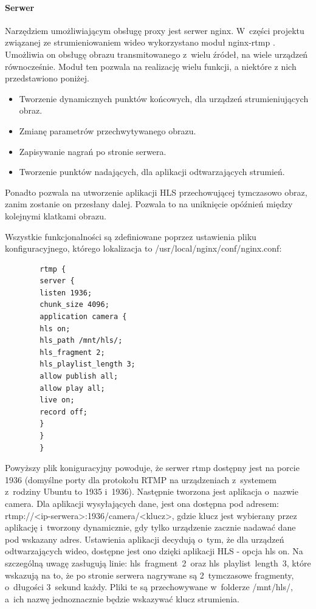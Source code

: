 \documentclass[polish,bachelor,a4paper,oneside]{ppfcmthesis}
\begin{document}
    \paragraph{Serwer}
    Narzędziem umożliwiającym obsługę proxy jest serwer nginx. W~części projektu związanej ze strumieniowaniem wideo wykorzystano moduł nginx-rtmp \cite{NGINX}. Umożliwia on obsługę obrazu transmitowanego z~wielu źródeł, na wiele urządzeń równocześnie.
    Moduł ten pozwala na realizację wielu funkcji, a niektóre z nich przedstawiono poniżej.
    \begin{itemize}
        \item Tworzenie dynamicznych punktów końcowych, dla urządzeń strumieniujących obraz.
        \item Zmianę parametrów przechwytywanego obrazu.
        \item Zapisywanie nagrań po stronie serwera.
        \item Tworzenie punktów nadających, dla aplikacji odtwarzających strumień.
    \end{itemize}
    Ponadto pozwala na utworzenie aplikacji HLS przechowującej tymczasowo obraz, zanim zostanie on przesłany dalej. Pozwala to na uniknięcie opóźnień między kolejnymi klatkami obrazu.

    Wszystkie funkcjonalności są zdefiniowane poprzez ustawienia pliku konfiguracyjnego, którego lokalizacja to /usr/local/nginx/conf/nginx.conf:

    \begin{verbatim}
        rtmp {
        server {
        listen 1936;
        chunk_size 4096;
        application camera {
        hls on;
        hls_path /mnt/hls/;
        hls_fragment 2;
        hls_playlist_length 3;
        allow publish all;
        allow play all;
        live on;
        record off;
        }
        }
        }
    \end{verbatim}

    Powyższy plik koniguracyjny powoduje, że serwer rtmp dostępny jest na porcie 1936 (domyślne porty dla protokołu RTMP na urządzeniach z~systemem z~rodziny Ubuntu to 1935 i~1936). Następnie tworzona jest aplikacja o~nazwie camera. Dla aplikacji wysyłających dane, jest ona dostępna pod adresem: rtmp://<ip-serwera>:1936/camera/<klucz>, gdzie klucz jest wybierany przez aplikację i~tworzony dynamicznie, gdy tylko urządzenie zacznie nadawać dane pod wskazany adres.
    Ustawienia aplikacji decydują o~tym, że dla urządzeń odtwarzających wideo, dostępne jest ono dzięki aplikacji HLS - opcja hls on. Na szczególną uwagę zasługują linie: hls~fragment~2~oraz hls~playlist~length~3, które wskazują na to, że po stronie serwera nagrywane są 2~tymczasowe fragmenty, o~długości 3~sekund każdy. Pliki te są przechowywane w~folderze /mnt/hls/, a~ich nazwę jednoznacznie będzie wskazywać klucz strumienia.
\end{document}
